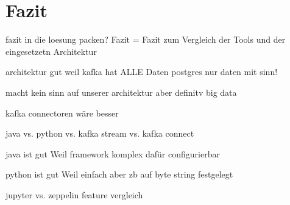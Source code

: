 \chapter{Fazit}
\label{chap:fazit}

fazit in die loesung packen? Fazit = Fazit zum Vergleich der Tools und der eingesetzetn Architektur

architektur gut weil
kafka hat ALLE Daten
postgres nur daten mit sinn!

macht kein sinn auf unserer architektur aber definitv big data

kafka connectoren wäre besser

java vs. python vs. kafka stream vs. kafka connect

java ist gut Weil
framework komplex dafür configurierbar

python ist  gut Weil
einfach aber zb auf byte string festgelegt

jupyter vs. zeppelin feature vergleich
